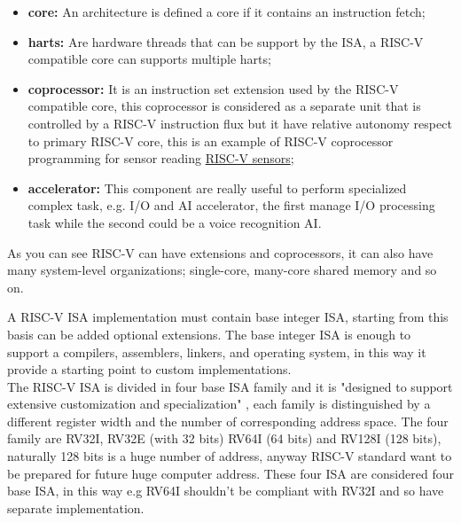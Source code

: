 {{	    \begin{itemize}
	        \item \textbf{core:} An architecture is defined a core if it contains an instruction fetch; 
	        \item \textbf{harts:} Are hardware threads that can be support by the ISA, a RISC-V compatible core can supports multiple harts;
	        \item \textbf{coprocessor:} It is an instruction set extension used by the RISC-V compatible core, this coprocessor is considered as a separate unit that is controlled by a RISC-V instruction flux but it have relative autonomy respect to primary RISC-V core, this is an example of RISC-V coprocessor programming for sensor reading \href{https://github.com/espressif/esp-idf/blob/c13afea635adec735435961270d0894ff46eef85/docs/en/api-guides/ulp-risc-v.rst}{RISC-V sensors};
	        \item \textbf{accelerator:} This component are really useful to perform specialized complex task, e.g. I/O and AI accelerator, the first manage I/O processing task while the second could be a voice recognition AI.
	    \end{itemize}
	    As you can see RISC-V can have extensions and coprocessors, it can also have many system-level organizations; single-core, many-core shared memory and so on.
	    
	    
	    A RISC-V ISA implementation must contain base integer ISA, starting from this basis can be added optional extensions. 
	    The base integer ISA is enough to support a compilers, assemblers, linkers, and operating system, in this way it provide a starting point to custom implementations.\\
	    
	    The RISC-V ISA is divided in four base ISA family and it is "designed to support extensive customization and specialization" , each family is distinguished by a different register width and the number of corresponding address space. 
	    The four family are RV32I, RV32E (with 32 bits) RV64I (64 bits) and RV128I (128 bits), naturally 128 bits is a huge number of address, anyway RISC-V standard want to be prepared for future huge computer address. These four ISA are considered four base ISA, in this way e.g RV64I shouldn't be compliant with RV32I and so have separate implementation.\\
	     
}}
